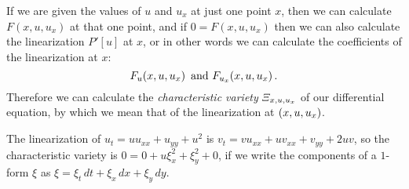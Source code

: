 If we are given the values of \(u\) and \(u_x\) at just one point \(x\), then we can calculate \(F(x,u,u_x)\) at that one point, and if \(0=F(x,u,u_x)\) then we can also calculate the linearization \(P'[u]\) at \(x\), or in other words we can calculate the coefficients of the linearization at \(x\):
\[
F_u\!\left(x,u,u_x\right) \text{ and } F_{u_x}\!\left(x,u,u_x\right).
\]
Therefore we can calculate the \emph{characteristic variety} \(\charvariety{x,u,u_x}\) of our differential equation, by which we mean that of the linearization at \(\left(x,u,u_x\right)\).
\begin{example}
The linearization of \(u_t=uu_{xx} + u_{yy} + u^2\) is \(v_t=vu_{xx} + uv_{xx} + v_{yy} + 2uv\), so the characteristic variety is \(0=0+u\xi_{x}^2 + \xi_y^2+0\), if we write the components of a \(1\)-form \(\xi\) as \(\xi=\xi_t \, dt  + \xi_x \, dx + \xi_y \, dy\).
\end{example}

